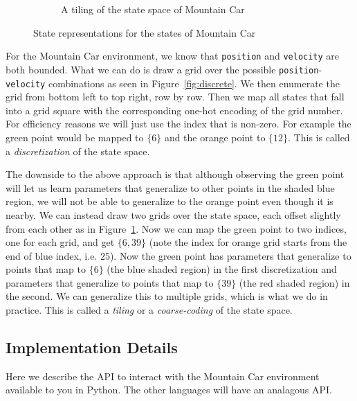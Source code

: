\documentclass[11pt,addpoints,answers]{exam}
\begin{document}
\begin{figure}[H]
\begin{subfigure}{0.5\textwidth}
\caption{A tiling of the state space of Mountain Car}
\label{fig:tiling}
\end{subfigure}

\caption{State representations for the states of Mountain Car}
\label{fig:states}
\end{figure}

For the Mountain Car environment, we know that \texttt{position} and \texttt{velocity} are both bounded. What we can do is draw a grid over the possible \texttt{position}-\texttt{velocity} combinations as seen in Figure~\ref{fig:discrete}. We then enumerate the grid from bottom left to top right, row by row. Then we map all states that fall into a grid square with the corresponding one-hot encoding of the grid number. For efficiency reasons we will just use the index that is non-zero. For example the green point would be mapped to $\{6\}$ and the orange point to $\{12\}$. This is called a \emph{discretization} of the state space.

The downside to the above approach is that although observing the green point will let us learn parameters that generalize to other points in the shaded blue region, we will not be able to generalize to the orange point even though it is nearby. We can instead draw two grids over the state space, each offset slightly from each other as in Figure~\ref{fig:tiling}. Now we can map the green point to two indices, one for each grid, and get $\{6, 39\}$ (note the index for orange grid starts from the end of blue index, i.e. 25). Now the green point has parameters that generalize to points that map to $\{6\}$ (the blue shaded region) in the first discretization and parameters that generalize to points that map to $\{39\}$ (the red shaded region) in the second. We can generalize this to multiple grids, which is what we do in practice. This is called a \emph{tiling} or a \emph{coarse-coding} of the state space. 


\subsection{Implementation Details}
Here we describe the API to interact with the Mountain Car environment available to you in Python. The other languages will have an analagous API. 
\end{document}

